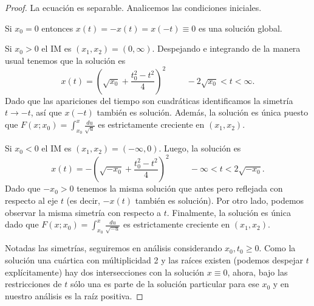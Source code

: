 \begin{proof}
La ecuación es separable. Analicemos las condiciones iniciales.

\begin{clist}
    \item Si \(x_0 = 0\) entonces \(x(t) = -x(t) = x(-t) \equiv 0\) es una solución
    global.

    \item Si \(x_0 > 0\) el IM es \((x_1, x_2) = (0,\infty)\). Despejando e
    integrando de la manera usual tenemos que la solución es
    \[
        x(t) = \left(\sqrt{x_0} + \frac{t_0^2 - t^2}{4}\right)^2
        \hspace{1cm}
        -2\sqrt{x_0} < t < \infty
    .\]
    Dado que las apariciones del tiempo son cuadráticas identificamos la
    simetría \(t \to -t\), así que \(x(-t)\) también es solución. Además,
    la solución es única puesto que \(F(x;x_0) =
    \int_{x_0}^{x} \frac{du}{\sqrt{u}}\) es estrictamente creciente en \((x_1, x_2)\).

    \item Si \(x_0 < 0\) el IM es \((x_1, x_2) = (-\infty, 0)\). Luego, la
    solución es
    \[
        x(t) = -\left(\sqrt{-x_0} + \frac{t_0^2 - t^2}{4}\right)^2
        \hspace{1cm}
        -\infty < t < 2\sqrt{-x_0}
    .\]
    Dado que \(-x_0 > 0\) tenemos la misma solución que antes pero reflejada con
    respecto al eje \(t\) (es decir, \(-x(t)\) también es solución).
    Por otro lado, podemos observar la misma simetría con respecto a \(t\).
    Finalmente, la solución es única dado que \(F(x;x_0) = \int_{x_0}^{x} \frac{du}
    {\sqrt{-u}}\) es estrictamente creciente en \((x_1, x_2)\).
\end{clist}

Notadas las simetrías, seguiremos en análisis considerando \(x_0, t_0 \ge 0\).
Como la solución una cuártica con múltiplicidad 2 y las raíces existen
(podemos despejar \(t\) explícitamente) hay dos intersecciones con la solución
\(x\equiv 0\), ahora, bajo las restricciones de \(t\) sólo una es parte
de la solución particular para ese \(x_0\) y en nuestro análisis es la raíz
positiva.


\end{proof}
